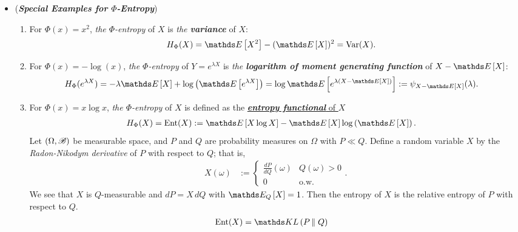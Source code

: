 \documentclass[11pt]{article}
\begin{document}
\begin{itemize}
\item \begin{example} (\emph{\textbf{Special Examples for $\Phi$-Entropy}})
\begin{enumerate}
\item For $\Phi(x) = x^2$, \emph{the $\Phi$-entropy} of $X$ is \emph{the \textbf{variance}} of $X$:
\begin{align*}
H_{\Phi}(X) &= \E{}{X^2} - (\E{}{X})^2 = \text{Var}(X).
\end{align*}
\item For $\Phi(x) = -\log(x)$, \emph{the $\Phi$-entropy} of $Y=e^{\lambda X}$ is \emph{the \textbf{logarithm of moment generating function}} of $X - \E{}{X}$:
\begin{align}
H_{\Phi}(e^{\lambda X}) &= -\lambda \E{}{X} + \log\paren{\E{}{e^{\lambda X}}} = \log\E{}{e^{\lambda(X - \E{}{X})}} := \psi_{X- \E{}{X}}(\lambda). \label{eqn: phi_entropy_log_mgf}
\end{align}
\item For $\Phi(x) = x\log x$, \emph{the $\Phi$-entropy} of $X$ is defined as the \underline{\emph{\textbf{entropy functional}} of $X$}
\begin{align}
H_{\Phi}(X) = \text{Ent}(X)&:=  \E{}{X\log X} - \E{}{X}\log\paren{\E{}{X}}. \label{def: phi_entropy_kl}
\end{align} Let $(\Omega, {\mathscr B})$ be measurable space, and $P$ and $Q$ are probability measures on $\Omega$ with $P \ll Q$. Define a random variable $X$ by the \emph{Radon-Nikodym derivative} of $P$ with respect to $Q$; that is,
\begin{align*}
X(\omega) &:= \left\{ \begin{array}{cc}
\frac{dP}{dQ}(\omega) & Q(\omega) > 0\\
0 &\text{o.w.}
\end{array}
\right. .
\end{align*} We see that $X$ is $Q$-measurable and $dP = X\,dQ$ with $\E{Q}{X} = 1$. Then the entropy of $X$ is the relative entropy of $P$ with respect to $Q$.
\begin{align}
\text{Ent}(X)&= \kl{P}{Q} \label{eqn: phi_entropy_kl_divg}
\end{align}
\end{enumerate}
\end{example}
\end{itemize}
\end{document}
